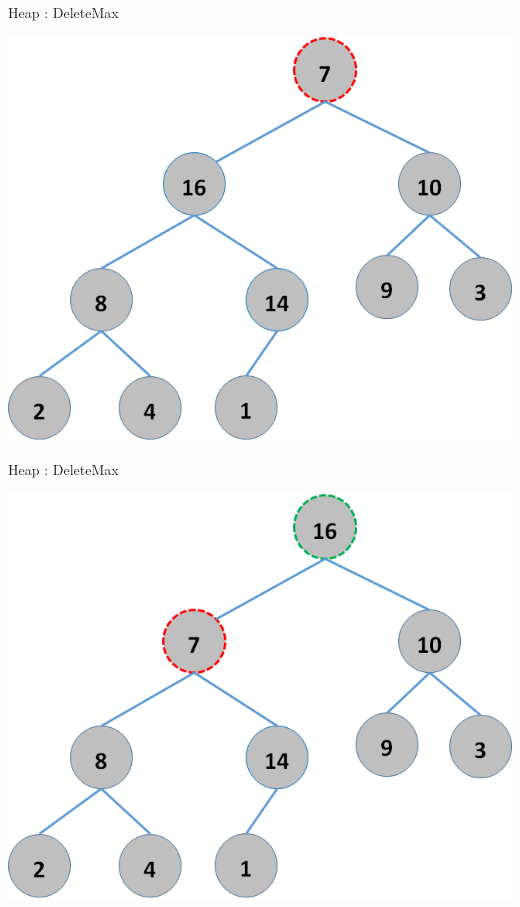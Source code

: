\documentclass{beamer}
\begin{document}
\begin{frame}{Heap : DeleteMax}
    \begin{center}
        \includegraphics[scale=0.5]{heapDelete3.png}
    \end{center}
\end{frame}



\begin{frame}{Heap : DeleteMax}
    \begin{center}
        \includegraphics[scale=0.5]{heapDelete4.png}
    \end{center}
\end{frame}
\end{document}
